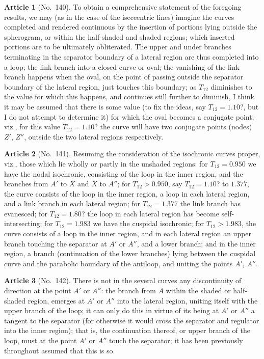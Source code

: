 \documentclass[11pt,a4paper]{article}
\theoremstyle{definition}
\newtheorem{art}{Article}
\begin{document}
\begin{art}[No.~140]
To obtain a comprehensive statement of the foregoing results, we may (as in the case of the iseccentric lines) imagine the curves completed and rendered continuous by the insertion of portions lying outside the spherogram, or within the half-shaded and shaded regions; which inserted portions are to be ultimately obliterated. The upper and under branches terminating in the separator boundary of a lateral region are thus completed into a loop; the link branch into a closed curve or oval; the vanishing of the link branch happens when the oval, on the point of passing outside the separator boundary of the lateral region, just touches this boundary; as $T_{12}$ diminishes to the value for which this happens, and continues still further to diminish, I think it may be assumed that there is some value (to fix the ideas, say $T_{12} = 1.10$?, but I do not attempt to determine it) for which the oval becomes a conjugate point; viz., for this value $T_{12} = 1.10$? the curve will have two conjugate points (nodes) $Z'$, $Z''$, outside the two lateral regions respectively.
\end{art}

\begin{art}[No.~141]
Resuming the consideration of the isochronic curves proper, viz., those which lie wholly or partly in the unshaded regions: for $T_{12} = 0.950$ we have the nodal isochronic, consisting of the loop in the inner region, and the branches from $A'$ to $X$ and $X$ to $A''$; for $T_{12} > 0.950$, say $T_{12} = 1.10$? to $1.377$, the curve consists of the loop in the inner region, a loop in each lateral region, and a link branch in each lateral region; for $T_{12} = 1.377$ the link branch has evanesced; for $T_{12} = 1.80$? the loop in each lateral region has become self-intersecting; for $T_{12} = 1.983$ we have the cuspidal isochronic; for $T_{12} > 1.983$, the curve consists of a loop in the inner region, and in each lateral region an upper branch touching the separator at $A'$ or $A''$, and a lower branch; and in the inner region, a branch (continuation of the lower branches) lying between the cuspidal curve and the parabolic boundary of the antiloop, and uniting the points $A'$, $A''$.
\end{art}

\begin{art}[No.~142]
There is not in the several curves any discontinuity of direction at the point $A'$ or $A''$: the branch from $A$ within the shaded or half-shaded region, emerges at $A'$ or $A''$ into the lateral region, uniting itself with the upper branch of the loop; it can only do this in virtue of its being at $A'$ or $A''$ a tangent to the separator (for otherwise it would cross the separator and regulator into the inner region); that is, the continuation thereof, or upper branch of the loop, must at the point $A'$ or $A''$ touch the separator; it has been previously throughout assumed that this is so.
\end{art}
\end{document}
